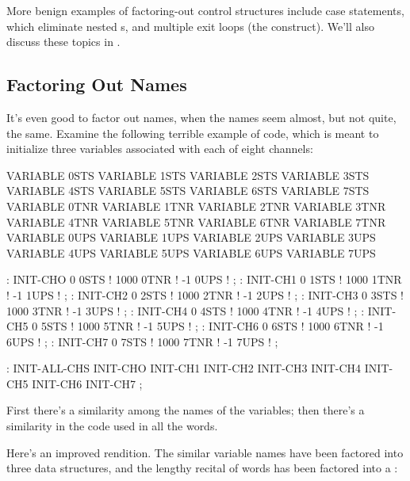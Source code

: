 More benign examples of factoring-out control structures include case
statements, which eliminate nested
s, and multiple exit loops
(the 
\forthb{\dots{} } construct). We'll also discuss these
topics in .

\subsection{Factoring Out Names}
%
It's even good to factor out names, when the names seem almost, but
not quite, the same. Examine the following terrible example of code,
which is meant to initialize three variables associated with each of
eight channels:

\begin{Code}
VARIABLE 0STS       VARIABLE 1STS       VARIABLE 2STS 
VARIABLE 3STS       VARIABLE 4STS       VARIABLE 5STS
VARIABLE 6STS       VARIABLE 7STS       VARIABLE 0TNR
VARIABLE 1TNR       VARIABLE 2TNR       VARIABLE 3TNR
VARIABLE 4TNR       VARIABLE 5TNR       VARIABLE 6TNR
VARIABLE 7TNR       VARIABLE 0UPS       VARIABLE 1UPS
VARIABLE 2UPS       VARIABLE 3UPS       VARIABLE 4UPS
VARIABLE 5UPS       VARIABLE 6UPS       VARIABLE 7UPS
\end{Code}

\begin{Code} 
: INIT-CHO   0 0STS !  1000 0TNR !  -1 0UPS ! ; 
: INIT-CH1   0 1STS !  1000 1TNR !  -1 1UPS ! ; 
: INIT-CH2   0 2STS !  1000 2TNR !  -1 2UPS ! ; 
: INIT-CH3   0 3STS !  1000 3TNR !  -1 3UPS ! ; 
: INIT-CH4   0 4STS !  1000 4TNR !  -1 4UPS ! ; 
: INIT-CH5   0 5STS !  1000 5TNR !  -1 5UPS ! ; 
: INIT-CH6   0 6STS !  1000 6TNR !  -1 6UPS ! ; 
: INIT-CH7   0 7STS !  1000 7TNR !  -1 7UPS ! ; 
\end{Code}

\begin{Code} 
: INIT-ALL-CHS    INIT-CHO  INIT-CH1  INIT-CH2  INIT-CH3
   INIT-CH4  INIT-CH5  INIT-CH6  INIT-CH7 ;
\end{Code}
First there's a similarity among the names of the variables; then
there's a similarity in the code used in all the 
words.

Here's an improved rendition. The similar variable names have been
factored into three data structures, and the lengthy recital of
 words has been factored into a :

